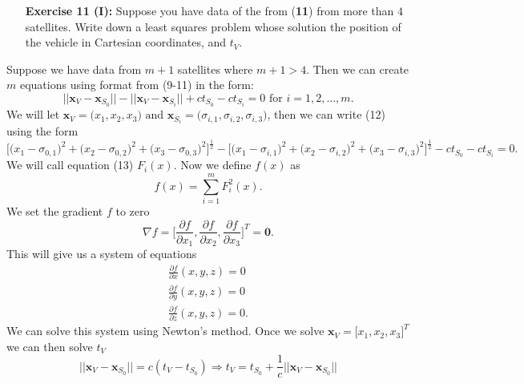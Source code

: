 \documentclass[11pt]{article}
\theoremstyle{definition}
\newcommand{\1}[1]{\mathbf{1} \left \{ #1 \right \}}
\begin{document}
\begin{itemize}
\item[{\textbf{Exercise 11 (I):}}] Suppose you have data of the from (\textbf{11}) from more than $4$ satellites.  Write down a least squares problem whose solution the position of the vehicle in Cartesian coordinates, and $t_V$.
\end{itemize}
Suppose we have data from $m+1$ satellites where $m+1>4$.  Then we can create $m$ equations using format from (9-11) in the form:
\begin{equation}
    ||\textbf{x}_V - \textbf{x}_{S_0}|| - ||\textbf{x}_V - \textbf{x}_{S_i}|| + ct_{S_0} - ct_{S_i} = 0 \text{ for } i = 1,2,...,m.
\end{equation}
We will let \(\textbf{x}_V = \big(x_1, x_2, x_3\big) \text{ and } \textbf{x}_{S_i} = \big(\sigma_{i,1}, \sigma_{i,2}, \sigma_{i,3}\big)\), then we can write (12) using the form
\begin{equation}
    \Big[\big(x_1 - \sigma_{0,1}\big)^2 + \big(x_2 - \sigma_{0,2}\big)^2 + \big(x_3 - \sigma_{0,3}\big)^2\Big]^{\frac{1}{2}} - \Big[\big(x_1 - \sigma_{i,1}\big)^2 + \big(x_2 - \sigma_{i,2}\big)^2 + \big(x_3 - \sigma_{i,3}\big)^2\Big]^{\frac{1}{2}} - ct_{S_0} - ct_{S_i} = 0.
\end{equation}
We will call equation (13) $F_i (x)$.  Now we define $f(x)$ as
\begin{equation}
    f(x) = \sum_{i=1}^m F_i^2 (x).
\end{equation}
We set the gradient $f$ to zero \[\nabla f = \Bigg[\frac{\partial f}{\partial x_1}, \frac{\partial f}{\partial x_2}, \frac{\partial f}{\partial x_3}\Bigg]^T = \textbf{0}.\]
This will give us a system of equations
\begin{align*}
    \frac{\partial f}{\partial x}(x,y,z) = 0 \\
    \frac{\partial f}{\partial y}(x,y,z) = 0 \\
    \frac{\partial f}{\partial z}(x,y,z) = 0.
\end{align*}
We can solve this system using Newton's method.  Once we solve \(\textbf{x}_V = \big[x_1, x_2, x_3\big]^T\) we can then solve $t_V$
\[\big|\big|\textbf{x}_V - \textbf{x}_{S_0}\big|\big| = c(t_V - t_{S_0}) \Rightarrow t_V = t_{S_0} + \frac{1}{c}\bigg|\bigg|\textbf{x}_V - \textbf{x}_{S_0}\bigg|\bigg|\]
\end{document}
